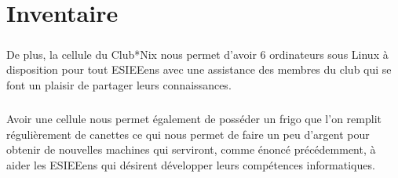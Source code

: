 \documentclass[11pt]{report}
\begin{document}
\chapter{Inventaire}

\paragraph{} De plus, la cellule du Club*Nix nous permet d'avoir 6 ordinateurs
sous Linux à disposition pour tout ESIEEens avec une assistance des membres du
club qui se font un plaisir de partager leurs connaissances.

\paragraph{} Avoir une cellule nous permet également de posséder un frigo que
l'on remplit régulièrement de canettes ce qui nous permet de faire un peu
d'argent pour obtenir de nouvelles machines qui serviront, comme énoncé
précédemment, à aider les ESIEEens qui désirent développer leurs compétences
informatiques.
\end{document}
